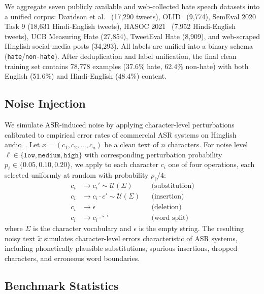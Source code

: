 \documentclass[conference]{IEEEtran}
\begin{document}
We aggregate seven publicly available and web-collected hate speech datasets into a unified corpus: Davidson et al.~\cite{davidson2017automated} (17,290 tweets), OLID~\cite{zampieri2019predicting} (9,774), SemEval 2020 Task 9 (18,631 Hindi-English tweets), HASOC 2021~\cite{mandl2021hasoc} (7,952 Hindi-English tweets), UCB Measuring Hate (27,854), TweetEval Hate (8,909), and web-scraped Hinglish social media posts (34,293). All labels are unified into a binary schema (\texttt{hate}/\texttt{non-hate}). After deduplication and label unification, the final clean training set contains 78,778 examples (37.6\% hate, 62.4\% non-hate) with both English (51.6\%) and Hindi-English (48.4\%) content.

\subsection{Noise Injection}
\label{sec:noise_injection}

We simulate ASR-induced noise by applying character-level perturbations calibrated to empirical error rates of commercial ASR systems on Hinglish audio~\cite{shah2020learning}. Let $x = (c_1, c_2, \ldots, c_n)$ be a clean text of $n$ characters. For noise level $\ell \in \{\texttt{low}, \texttt{medium}, \texttt{high}\}$ with corresponding perturbation probability $p_\ell \in \{0.05, 0.10, 0.20\}$, we apply to each character $c_i$ one of four operations, each selected uniformly at random with probability $p_\ell / 4$:
\begin{align}
    c_i &\to c_i' \sim \mathcal{U}(\Sigma) && \text{(substitution)} \label{eq:sub} \\
    c_i &\to c_i \cdot c' \sim \mathcal{U}(\Sigma) && \text{(insertion)} \label{eq:ins} \\
    c_i &\to \epsilon && \text{(deletion)} \label{eq:del} \\
    c_i &\to c_i \cdot \texttt{` '} && \text{(word split)} \label{eq:split}
\end{align}
where $\Sigma$ is the character vocabulary and $\epsilon$ is the empty string. The resulting noisy text $\tilde{x}$ simulates character-level errors characteristic of ASR systems, including phonetically plausible substitutions, spurious insertions, dropped characters, and erroneous word boundaries.

\subsection{Benchmark Statistics}
\end{document}
